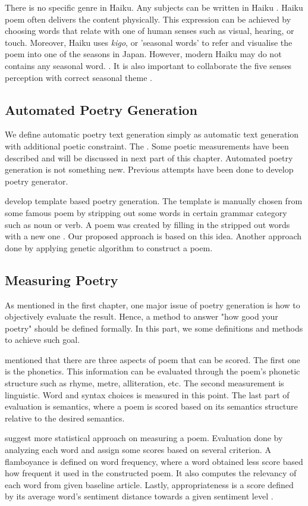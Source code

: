 There is no specific genre in Haiku. Any subjects can be written in Haiku \cite{Haiku_JP}. Haiku poem often delivers the content physically. This expression can be achieved by choosing words that relate with one of human senses such as visual, hearing, or touch. Moreover, Haiku uses \textit{kigo}, or 'seasonal words' to refer and visualise the poem into one of the seasons in Japan. However, modern Haiku may do not contains any seasonal word. \cite{Haiku_JP}. It is also important to collaborate the five senses perception with correct seasonal theme \cite{Haiku_poet}.

\subsection{Automated Poetry Generation}

We define automatic poetry text generation simply as automatic text generation with additional poetic constraint. The . Some poetic measurements have been described and will be discussed in next part of this chapter. Automated poetry generation is not something new. Previous attempts have been done to develop poetry generator. 

\citeauthor{rashelpemuisi} develop template based poetry generation. The template is manually chosen from some famous poem by stripping out some words in certain grammar category such as noun or verb. A poem was created by filling in the stripped out words with a new one \cite{rashelpemuisi}. Our proposed approach is based on this idea. Another approach done by applying genetic algorithm to construct a poem\cite{manurung2012using}.

\subsection{Measuring Poetry}

As mentioned in the first chapter, one major issue of poetry generation is how to objectively evaluate the result. Hence, a method to answer "how good your poetry" should be defined formally. In this part, we some definitions and methods to achieve such goal.

\citeauthor{manurung2000towards} mentioned that there are three aspects of poem that can be scored. The first one is the phonetics. This information can be evaluated through the poem's phonetic structure such as rhyme, metre, alliteration, etc. The second measurement is linguistic. Word and syntax choices is measured in this point. The last part of evaluation is semantics, where a poem is scored based on its semantics structure relative to the desired semantics\cite{manurung2000towards}.

 \citeauthor{colton2012full} suggest more statistical approach on measuring a poem. Evaluation done by analyzing each word and assign some scores based on several criterion. A flamboyance is defined on word frequency, where a word obtained less score based how frequent it used in the constructed poem. It also computes the relevancy of each word from given baseline article. Lastly, appropriateness is a score defined by its average word's sentiment distance towards a given sentiment level \cite{colton2012full}.



